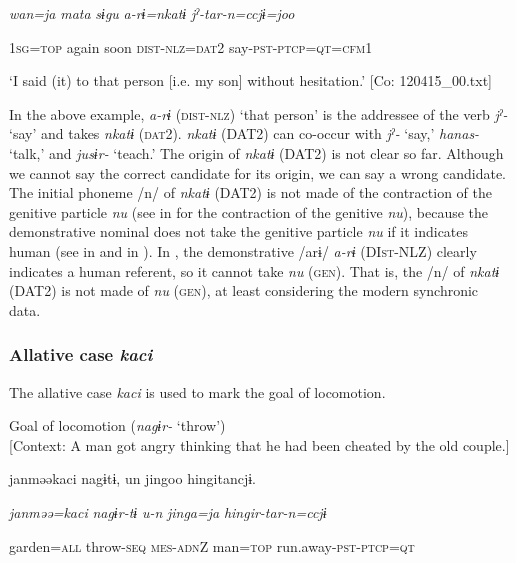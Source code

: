     \textit{wan=ja}  \textit{mata}  \textit{sɨgu}  \textit{a-rɨ=nkatɨ}  \textit{jˀ-tar-n=ccjɨ=joo}

    1\textsc{sg}=\textsc{top}  again  soon  \textsc{dist}-\textsc{nlz}=\textsc{dat}2  say-\textsc{pst}-\textsc{ptcp}=\textsc{qt}=\textsc{cfm}1

\glt    ‘I said (it) to that person [i.e. my son] without hesitation.’ [Co: 120415\_00.txt]
\z

In the above example, \textit{a-rɨ} (\textsc{dist}-\textsc{nlz}) ‘that person’ is the addressee of the verb \textit{jˀ-} ‘say’ and takes \textit{nkatɨ} (\textsc{dat}2). \textit{nkatɨ} (DAT2) can co-occur with \textit{jˀ-} ‘say,’ \textit{hanas-} ‘talk,’ and \textit{jusɨr-} ‘teach.’ The origin of \textit{nkatɨ} (DAT2) is not clear so far. Although we cannot say the correct candidate for its origin, we can say a wrong candidate. The initial phoneme /n/ of \textit{nkatɨ} (DAT2) is not made of the contraction of the genitive particle \textit{nu} (see  in  for the contraction of the genitive \textit{nu}), because the demonstrative nominal does not take the genitive particle \textit{nu} if it indicates human (see  in  and  in ). In , the demonstrative /arɨ/ \textit{a-rɨ} (DI\textsc{st}-NLZ) clearly indicates a human referent, so it cannot take \textit{nu} (\textsc{gen}). That is, the /n/ of \textit{nkatɨ} (DAT2) is not made of \textit{nu} (\textsc{gen}), at least considering the modern synchronic data.

\subsubsection{Allative case \textit{kaci}}

The allative case \textit{kaci} is used to mark the goal of locomotion.

\ea\label{ex:6-59}
\ea Goal of locomotion (\textit{nagɨr-} ‘throw’)\\{}
[Context: A man got angry thinking that he had been cheated by the old couple.]

{\TM}
\gll janməəkaci  nagɨtɨ,  un  jingoo  hingitancjɨ.

      \textit{janməə=kaci}  \textit{nagɨr-tɨ}  \textit{u-n}  \textit{jinga=ja}  \textit{hingir-tar-n=ccjɨ}

      garden=\textsc{all}  throw-\textsc{seq}  \textsc{mes}-\textsc{adn}Z  man=\textsc{top}  run.away-\textsc{pst}-\textsc{ptcp}=\textsc{qt}

